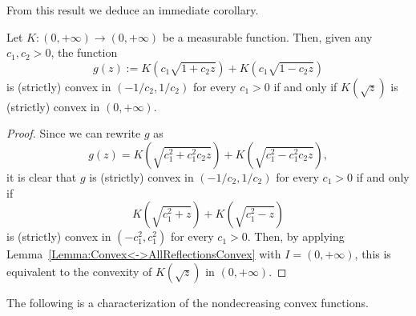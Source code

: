 From this result we deduce an immediate corollary.

\begin{corollary}
\label{Cor:gConvex<->K(sqrt)convex} Let $K:(0,+\infty) \to (0,+\infty)$ be a measurable function.
Then, given any $c_1,c_2>0$, the function
$$
g(z) := K \left (c_1 \sqrt{1 + c_2 z}\right) +  K \left (c_1 \sqrt{1 - c_2 z}\right)
$$
is  (strictly) convex in $(-1/c_2, 1/c_2)$ for every $c_1>0$ if and only if $K(\sqrt{z})$ is
(strictly) convex in $(0, +\infty)$.
\end{corollary}
\begin{proof}
Since we can rewrite $g$ as
$$
g(z) = K \left (\sqrt{c_1^2 + c_1^2c_2 z}\right) +  K \left (\sqrt{c_1^2 - c_1^2c_2 z}\right),
$$
it is clear that $g$ is  (strictly) convex in $(-1/c_2, 1/c_2)$ for every $c_1>0$ if and only if
$$
K \left(\sqrt{c_1^2 + z}\right) +  K \left(\sqrt{c_1^2 - z}\right)
$$
is (strictly) convex in $(-c_1^2, c_1^2)$ for every $c_1>0$. Then, by applying
Lemma~\ref{Lemma:Convex<->AllReflectionsConvex} with $I = (0,+\infty)$, this is equivalent to the
convexity of $K(\sqrt{z})$ in $(0, +\infty)$.
\end{proof}

The following is a characterization of the nondecreasing convex functions.

